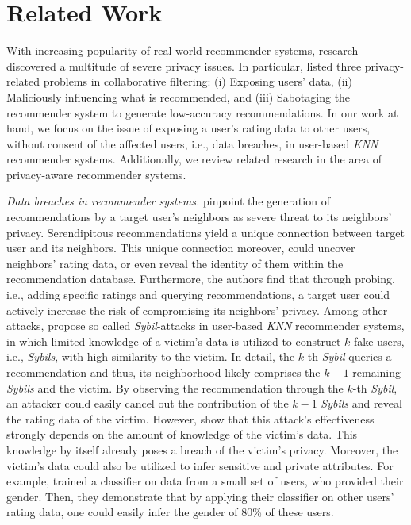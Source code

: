 \documentclass[manuscript,review,anonymous]{acmart}
\begin{document}
\section{Related Work}
With increasing popularity of real-world recommender systems, research discovered a multitude of severe privacy issues.
In particular, \cite{shyong2006you} listed three privacy-related problems in collaborative filtering: (i) Exposing users' data, (ii) Maliciously influencing what is recommended, and (iii) Sabotaging the recommender system to generate low-accuracy recommendations.
In our work at hand, we focus on the issue of exposing a user's rating data to other users, without consent of the affected users, i.e., data breaches, in user-based \emph{KNN} recommender systems. Additionally, we review related research in the area of privacy-aware recommender systems.


\vspace{2mm} \noindent \emph{Data breaches in recommender systems.}
\cite{ramakrishnan2001being} pinpoint the generation of recommendations by a target user's neighbors as severe threat to its neighbors' privacy.
Serendipitous recommendations yield a unique connection between target user and its neighbors.
This unique connection moreover, could uncover neighbors' rating data, or even reveal the identity of them within the recommendation database.
Furthermore, the authors find that through probing, i.e., adding specific ratings and querying recommendations, a target user could actively increase the risk of compromising its neighbors' privacy.
Among other attacks,  \cite{calandrino2011you} propose so called \emph{Sybil}-attacks in user-based \emph{KNN} recommender systems, in which limited knowledge of a victim's data is utilized to construct $k$ fake users, i.e., \emph{Sybils}, with high similarity to the victim.
In detail, the $k$-th \emph{Sybil} queries a recommendation and thus, its neighborhood likely comprises the $k-1$ remaining \emph{Sybils} and the victim.
By observing the recommendation through the $k$-th \emph{Sybil}, an attacker could easily cancel out the contribution of the $k-1$ \emph{Sybils} and reveal the rating data of the victim.
However, \cite{frey2015collaborative} show that this attack's effectiveness strongly depends on the amount of knowledge of the victim's data.
This knowledge by itself already poses a breach of the victim's privacy.
Moreover, the victim's data could also be utilized to infer sensitive and private attributes.
For example, \cite{weinsberg2012blurme} trained a classifier on data from a small set of users, who provided their gender.
Then, they demonstrate that by applying their classifier on other users' rating data, one could easily infer the gender of 80\% of these users.
\end{document}
